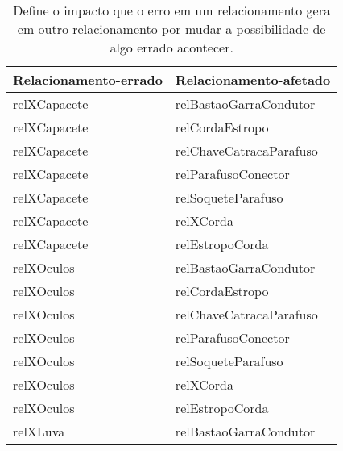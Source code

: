 \begin{center}
\begin{longtable}[H]{|l|l|}
\caption{Define o impacto que o erro em um relacionamento gera em outro relacionamento por mudar a possibilidade de algo errado acontecer.} \label{relation1}
\\
\hline
\textbf{Relacionamento-errado} 					& \textbf{Relacionamento-afetado}   			   \\ \hline
relXCapacete                                    & relBastaoGarraCondutor                           \\ \hline
relXCapacete                                    & relCordaEstropo                                  \\ \hline
relXCapacete                                    & relChaveCatracaParafuso                          \\ \hline
relXCapacete                                    & relParafusoConector                              \\ \hline
relXCapacete                                    & relSoqueteParafuso                               \\ \hline
relXCapacete                                    & relXCorda                                        \\ \hline
relXCapacete                                    & relEstropoCorda                                  \\ \hline
relXOculos                                      & relBastaoGarraCondutor                           \\ \hline
relXOculos                                      & relCordaEstropo                                  \\ \hline
relXOculos                                      & relChaveCatracaParafuso                          \\ \hline
relXOculos                                      & relParafusoConector                              \\ \hline
relXOculos                                      & relSoqueteParafuso                               \\ \hline
relXOculos                                      & relXCorda                                        \\ \hline
relXOculos                                      & relEstropoCorda                                  \\ \hline
relXLuva                                        & relBastaoGarraCondutor                           \\ \hline

\end{longtable}
\end{center}
